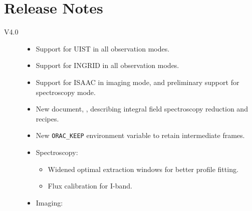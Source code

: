 \documentclass[twoside,11pt,nolof]{starlink}
\begin{document}
\scfrontmatter









\section{Release Notes}

\begin{description}

\item[V4.0]

\begin{itemize}

\item Support for UIST in all observation modes.

\item Support for INGRID in all observation modes.

\item Support for ISAAC in imaging mode, and preliminary support for
spectroscopy mode.

\item New document, , describing integral field
  spectroscopy reduction and recipes.

\item New \texttt{ORAC\_KEEP} environment variable to retain intermediate
  frames.

\item Spectroscopy:

\begin{itemize}

\item Widened optimal extraction windows for better profile fitting.

\item Flux calibration for I-band.

\end{itemize}

\item Imaging:

\begin{itemize}


\end{itemize}
\end{itemize}
\end{description}
\end{document}

